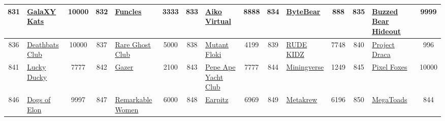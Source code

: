 \begin{table*}[]
{\begin{tabular}{|c|l|c|c|l|c|c|l|c|c|l|c|c|l|c|}
        831   & \href{http://galaxy.art}{GalaXY Kats}                                              & 10000             & 832   & \href{http://funcles.io}{Funcles}                                                                 & 3333              & 833   & \href{https://aikovirtual.com}{Aiko Virtual}                                      & 8888              & 834   & \href{https://opensea.io/collection/byte-bear}{ByteBear}                      & 888               & 835   & \href{https://buzzedbearhideout.com/}{Buzzed Bear Hideout}                                & 9999                                    \\ \hline
        836   & \href{https://avengedsevenfold.io}{Deathbats Club}                                 & 10000             & 837   & \href{https://www.rareghostclub.com/}{Rare Ghost Club}                                            & 5000              & 838   & \href{http://mutantfloki.com}{Mutant Floki}                                       & 4199              & 839   & \href{http://rudekidz.com}{RUDE KIDZ}                                         & 7748              & 840   & \href{http://projectdraca.com/}{Project Draca}                                            & 996                                     \\ \hline
        841   & \href{http://luckyduckynft.com}{Lucky Ducky}                                       & 7777              & 842   & \href{https://abyssworld.games/}{Gazer}                                                           & 2100              & 843   & \href{https://payc-genesis.netlify.app/}{Pepe Ape Yacht Club}                     & 7777              & 844   & \href{https://miningversenft.com/}{Miningverse}                               & 1249              & 845   & \href{https://pixelfoxesnft.com}{Pixel Foxes}                                             & 10000                                   \\ \hline
        846   & \href{https://kudoe.io/}{Dogs of Elon}                                             & 9997              & 847   & \href{https://houseoffirst.com}{Remarkable Women}                                                 & 6000              & 848   & \href{https://earpitz.io/}{Earpitz}                                               & 6969              & 849   & \href{http://metakrew.com/}{Metakrew}                                         & 6196              & 850   & \href{https://www.supducks.com}{MegaToads}                                                & 844                                     \\ \hline

\end{tabular}}
\end{table*}

